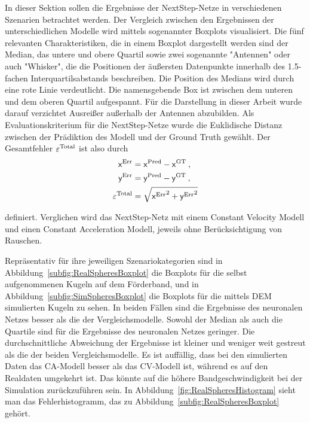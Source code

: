 In dieser Sektion sollen die Ergebnisse der NextStep-Netze in verschiedenen Szenarien betrachtet werden.
Der Vergleich zwischen den Ergebnissen der unterschiedlichen Modelle wird mittels sogenannter Boxplots visualisiert.
Die fünf relevanten Charakteristiken, die in einem Boxplot dargestellt werden sind 
der Median, das untere und obere Quartil sowie zwei sogenannte "Antennen" oder auch "Whisker", die die Positionen der äußersten Datenpunkte innerhalb des 1.5-fachen Interquartilsabstands beschreiben.
Die Position des Medians wird durch eine rote Linie verdeutlicht.
Die namensgebende Box ist zwischen dem unteren und dem oberen Quartil aufgespannt.
Für die Darstellung in dieser Arbeit wurde darauf verzichtet Ausreißer außerhalb der Antennen abzubilden.
Als Evaluationskriterium für die NextStep-Netze wurde die Euklidische Distanz zwischen der Prädiktion des Modell und der Ground Truth gewählt.
Der Gesamtfehler \(\varepsilon{^{\text{Total}}} \) ist also durch 
% 
\begin{align*}
    \mathsf{x}{^{\text{Err}}} &=  \mathsf{x}{^{\text{Pred}}} -  \mathsf{x}{^{\text{GT}}} \: ,\\
    \mathsf{y}{^{\text{Err}}} &=  \mathsf{y}{^{\text{Pred}}} -  \mathsf{y}{^{\text{GT}}} \: ,\\
    \varepsilon{^{\text{Total}}} &= \sqrt{ \mathsf{x}{^{\text{Err}}}^2 +  \mathsf{y}{^{\text{Err}}}^2}
\end{align*}

definiert. Verglichen wird das NextStep-Netz mit einem Constant Velocity Modell und einen Constant Acceleration Modell, jeweils ohne Berücksichtigung von Rauschen. 

Repräsentativ für ihre jeweiligen Szenariokategorien sind in Abbildung~\ref{subfig:RealSpheresBoxplot} die Boxplots für die selbst aufgenommenen Kugeln auf dem Förderband,
und in Abbildung~\ref{subfig:SimSpheresBoxplot} die Boxplots für die mittels DEM simulierten Kugeln zu sehen.
In beiden Fällen sind die Ergebnisse des neuronalen Netzes besser als die der Vergleichsmodelle.
Sowohl der Median als auch die Quartile sind für die Ergebnisse des neuronalen Netzes geringer.
Die durchschnittliche Abweichung der Ergebnisse ist kleiner und weniger weit gestreut als die der beiden Vergleichsmodelle.
Es ist auffällig, dass bei den simulierten Daten das CA-Modell besser als das CV-Modell ist, während es auf den Realdaten umgekehrt ist.
Das könnte auf die höhere Bandgeschwindigkeit bei der Simulation zurückzuführen sein. 
In Abbildung~\ref{fig:RealSpheresHistogram} sieht man das Fehlerhistogramm, das zu Abbildung~\ref{subfig:RealSpheresBoxplot} gehört.




